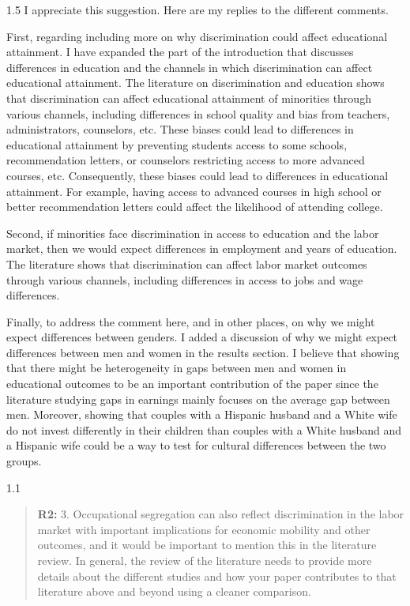 \documentclass[12pt,english]{article}
\newcommand{\rrquote}{1.1}
\newcommand{\rrxspc}{1.5}
\begin{document}
\begin{refsection}
        \begin{spacing}{\rrxspc}
            I appreciate this suggestion. Here are my replies to the different comments.
            
            First, regarding including more on why discrimination could affect educational attainment. I have expanded the part of the introduction that discusses differences in education and the channels in which discrimination can affect educational attainment. The literature on discrimination and education shows that discrimination can affect educational attainment of minorities through various channels, including differences in school quality and bias from teachers, administrators, counselors, etc. These biases could lead to differences in educational attainment by preventing students access to some schools, recommendation letters, or counselors restricting access to more advanced courses, etc. Consequently, these biases could lead to differences in educational attainment. For example, having access to advanced courses in high school or better recommendation letters could affect the likelihood of attending college.

            Second, if minorities face discrimination in access to education and the labor market, then we would expect differences in employment and years of education. The literature shows that discrimination can affect labor market outcomes through various channels, including differences in access to jobs and wage differences.
            
            Finally, to address the comment here, and in other places, on why we might expect differences between genders. I added a discussion of why we might expect differences between men and women in the results section. I believe that showing that there might be heterogeneity in gaps between men and women in educational outcomes to be an important contribution of the paper since the literature studying gaps in earnings mainly focuses on the average gap between men. Moreover, showing that couples with a Hispanic husband and a White wife do not invest differently in their children than couples with a White husband and a Hispanic wife could be a way to test for cultural differences between the two groups. 
        \end{spacing}

    \begin{spacing}{\rrquote}
        \begin{quotation}
        \textbf{R2: } 3. Occupational segregation can also reflect discrimination in the labor market with important implications for economic mobility and other outcomes, and it would be important to mention this in the literature review. In general, the review of the literature needs to provide more details about the different studies and how your paper contributes to that literature above and beyond using a cleaner comparison.
        \end{quotation}
        \end{spacing}
        

\end{refsection}
\end{document}

